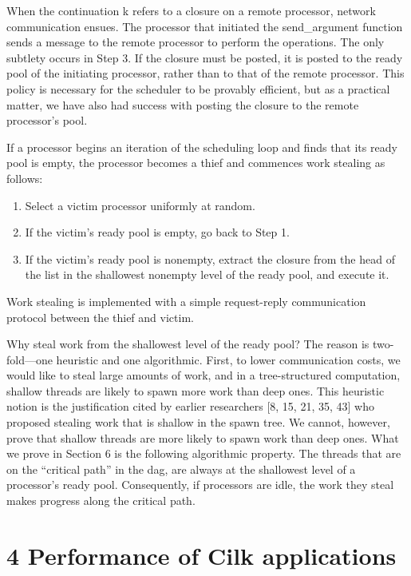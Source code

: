 \documentclass[
]{article}
\newcounter{none} %
\providecommand{\tightlist}{%
  \setlength{\itemsep}{0pt}\setlength{\parskip}{0pt}}
\begin{document}
When the continuation k refers to a closure on a remote processor,
network communication ensues. The processor that initiated the
send\_argument function sends a message to the remote processor to
perform the operations. The only subtlety occurs in Step 3. If the
closure must be posted, it is posted to the ready pool of the initiating
processor, rather than to that of the remote processor. This policy is
necessary for the scheduler to be provably efficient, but as a practical
matter, we have also had success with posting the closure to the remote
processor's pool.

If a processor begins an iteration of the scheduling loop and finds that
its ready pool is empty, the processor becomes a thief and commences
work stealing as follows:

\begin{enumerate}
\def\labelenumi{\arabic{enumi}.}
\tightlist
\item
  Select a victim processor uniformly at random.\\
\item
  If the victim's ready pool is empty, go back to Step 1.\\
\item
  If the victim's ready pool is nonempty, extract the closure from the
  head of the list in the shallowest nonempty level of the ready pool,
  and execute it.
\end{enumerate}

Work stealing is implemented with a simple request-reply communication
protocol between the thief and victim.

Why steal work from the shallowest level of the ready pool? The reason
is two-fold---one heuristic and one algorithmic. First, to lower
communication costs, we would like to steal large amounts of work, and
in a tree-structured computation, shallow threads are likely to spawn
more work than deep ones. This heuristic notion is the justification
cited by earlier researchers {[}8, 15, 21, 35, 43{]} who proposed
stealing work that is shallow in the spawn tree. We cannot, however,
prove that shallow threads are more likely to spawn work than deep ones.
What we prove in Section 6 is the following algorithmic property. The
threads that are on the ``critical path'' in the dag, are always at the
shallowest level of a processor's ready pool. Consequently, if
processors are idle, the work they steal makes progress along the
critical path.

\section{4 Performance of Cilk
applications}\label{performance-of-cilk-applications}
\end{document}
